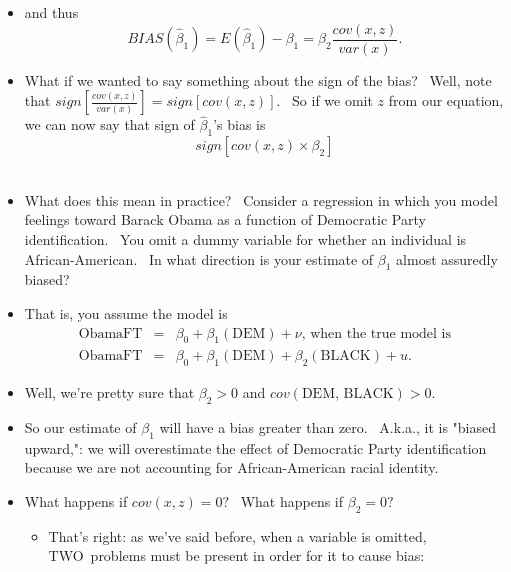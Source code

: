 \documentclass[11pt]{article}
\begin{document}
\begin{itemize}
\item and thus 
\begin{equation*}
BIAS\left( \widehat{\beta }_{1}\right) =E\left( \widehat{\beta }_{1}\right)
-\beta _{1}=\beta _{2}\frac{cov(x,z)}{var(x)}.
\end{equation*}

\item What if we wanted to say something about the sign of the bias? \ Well,
note that $sign\left[ \frac{cov(x,z)}{var(x)}\right] =sign\left[ cov(x,z)%
\right] .$ \ So if we omit $z$ from our equation, we can now say that sign
of $\widehat{\beta }_{1}$'s bias is 
\begin{equation*}
sign\left[ cov(x,z)\times \beta _{2}\right]
\end{equation*}%
\ 

\item What does this mean in practice? \ Consider a regression in which you
model feelings toward Barack Obama as a function of Democratic Party
identification. \ You omit a dummy variable for whether an individual is
African-American. \ In what direction is your estimate of $\beta _{1}$
almost assuredly biased?

\item That is, you assume the model is%
\begin{eqnarray*}
\text{ObamaFT} &=&\beta _{0}+\beta _{1}\left( \text{DEM}\right) +\nu \text{,
when the true model is} \\
\text{ObamaFT} &=&\beta _{0}+\beta _{1}\left( \text{DEM}\right) +\beta
_{2}\left( \text{BLACK}\right) +u.
\end{eqnarray*}

\item Well, we're pretty sure that $\beta _{2}>0$ and $cov\left( \text{DEM,
BLACK}\right) >0.$

\item So our estimate of $\beta _{1}$ will have a bias greater than zero. \
A.k.a., it is "biased upward,": we will overestimate the effect of
Democratic Party identification because we are not accounting for
African-American racial identity.

\item What happens if $cov(x,z)=0?$ \ What happens if $\beta _{2}=0?$ \ 

\begin{itemize}
\item That's right: as we've said before, when a variable is omitted, TWO\
problems must be present in order for it to cause bias:


\end{itemize}
\end{itemize}
\end{document}
